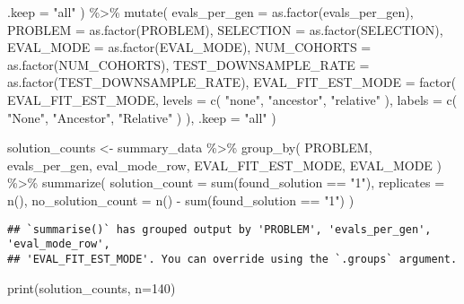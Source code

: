 \documentclass[
]{book}
\newenvironment{Shaded}{\begin{snugshade}}{\end{snugshade}}
\newcommand{\AttributeTok}[1]{\textcolor[rgb]{0.77,0.63,0.00}{#1}}
\newcommand{\DecValTok}[1]{\textcolor[rgb]{0.00,0.00,0.81}{#1}}
\newcommand{\FunctionTok}[1]{\textcolor[rgb]{0.00,0.00,0.00}{#1}}
\newcommand{\NormalTok}[1]{#1}
\newcommand{\OtherTok}[1]{\textcolor[rgb]{0.56,0.35,0.01}{#1}}
\newcommand{\SpecialCharTok}[1]{\textcolor[rgb]{0.00,0.00,0.00}{#1}}
\newcommand{\StringTok}[1]{\textcolor[rgb]{0.31,0.60,0.02}{#1}}
\begin{document}
\begin{Shaded}
\begin{Highlighting}[]
    \AttributeTok{.keep =} \StringTok{"all"}
\NormalTok{  ) }\SpecialCharTok{\%\textgreater{}\%}
  \FunctionTok{mutate}\NormalTok{(}
    \AttributeTok{evals\_per\_gen =} \FunctionTok{as.factor}\NormalTok{(evals\_per\_gen),}
    \AttributeTok{PROBLEM =} \FunctionTok{as.factor}\NormalTok{(PROBLEM),}
    \AttributeTok{SELECTION =} \FunctionTok{as.factor}\NormalTok{(SELECTION),}
    \AttributeTok{EVAL\_MODE =} \FunctionTok{as.factor}\NormalTok{(EVAL\_MODE),}
    \AttributeTok{NUM\_COHORTS =} \FunctionTok{as.factor}\NormalTok{(NUM\_COHORTS),}
    \AttributeTok{TEST\_DOWNSAMPLE\_RATE =} \FunctionTok{as.factor}\NormalTok{(TEST\_DOWNSAMPLE\_RATE),}
    \AttributeTok{EVAL\_FIT\_EST\_MODE =} \FunctionTok{factor}\NormalTok{(}
\NormalTok{      EVAL\_FIT\_EST\_MODE,}
      \AttributeTok{levels =} \FunctionTok{c}\NormalTok{(}
        \StringTok{"none"}\NormalTok{,}
        \StringTok{"ancestor"}\NormalTok{,}
        \StringTok{"relative"}
\NormalTok{      ),}
      \AttributeTok{labels =} \FunctionTok{c}\NormalTok{(}
        \StringTok{"None"}\NormalTok{,}
        \StringTok{"Ancestor"}\NormalTok{,}
        \StringTok{"Relative"}
\NormalTok{      )}
\NormalTok{    ),}
    \AttributeTok{.keep =} \StringTok{"all"}
\NormalTok{  )}

\NormalTok{solution\_counts }\OtherTok{\textless{}{-}}\NormalTok{ summary\_data }\SpecialCharTok{\%\textgreater{}\%}
  \FunctionTok{group\_by}\NormalTok{(}
\NormalTok{    PROBLEM,}
\NormalTok{    evals\_per\_gen,}
\NormalTok{    eval\_mode\_row,}
\NormalTok{    EVAL\_FIT\_EST\_MODE,}
\NormalTok{    EVAL\_MODE}
\NormalTok{  ) }\SpecialCharTok{\%\textgreater{}\%}
  \FunctionTok{summarize}\NormalTok{(}
    \AttributeTok{solution\_count =} \FunctionTok{sum}\NormalTok{(found\_solution }\SpecialCharTok{==} \StringTok{"1"}\NormalTok{),}
    \AttributeTok{replicates =} \FunctionTok{n}\NormalTok{(),}
    \AttributeTok{no\_solution\_count =} \FunctionTok{n}\NormalTok{() }\SpecialCharTok{{-}} \FunctionTok{sum}\NormalTok{(found\_solution }\SpecialCharTok{==} \StringTok{"1"}\NormalTok{)}
\NormalTok{  )}
\end{Highlighting}
\end{Shaded}

\begin{verbatim}
## `summarise()` has grouped output by 'PROBLEM', 'evals_per_gen', 'eval_mode_row',
## 'EVAL_FIT_EST_MODE'. You can override using the `.groups` argument.
\end{verbatim}

\begin{Shaded}
\begin{Highlighting}[]
\FunctionTok{print}\NormalTok{(solution\_counts, }\AttributeTok{n=}\DecValTok{140}\NormalTok{)}
\end{Highlighting}
\end{Shaded}
\end{document}
